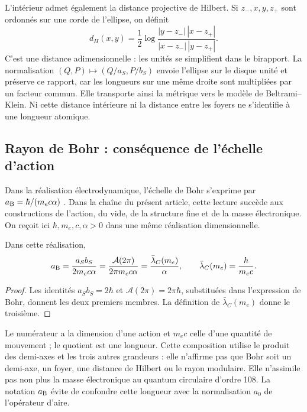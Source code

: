 L'intérieur admet également la distance projective de Hilbert. Si
\(z_-,x,y,z_+\) sont ordonnés sur une corde de l'ellipse, on définit
\[
 d_H(x,y)=\frac12\log
 \frac{|y-z_-|\,|x-z_+|}{|x-z_-|\,|y-z_+|}.
\]
C'est une distance adimensionnelle : les unités se simplifient dans le birapport.
La normalisation \((Q,P)\mapsto(Q/a_S,P/b_S)\) envoie l'ellipse
sur le disque unité et préserve ce rapport, car les longueurs sur une
même droite sont multipliées par un facteur commun. Elle transporte ainsi la métrique
vers le modèle de Beltrami--Klein. Ni cette distance intérieure ni la distance
entre les foyers ne s'identifie à une longueur atomique.

\subsection{Rayon de Bohr : conséquence de l'échelle d'action}
\label{sec:ii-elipse-bohr}

Dans la réalisation électrodynamique, l'échelle de Bohr s'exprime par
\(a_{\rm B}=\hbar/(m_ec\alpha)\) \cite{codata2022}. Dans la chaîne
du présent article, cette lecture succède aux constructions de
l'action, du vide, de la structure fine et de la masse électronique. On reçoit ici
\(\hbar,m_e,c,\alpha>0\) dans une même réalisation dimensionnelle.
\begin{proposition}
\label{prop:ii-elipse-bohr}
Dans cette réalisation,
\begin{equation}
 a_{\rm B}=\frac{a_Sb_S}{2m_ec\alpha}
 =\frac{\mathcal A(2\pi)}{2\pi m_ec\alpha}
 =\frac{\bar\lambda_C(m_e)}{\alpha},\qquad
 \bar\lambda_C(m_e)=\frac{\hbar}{m_ec}.
 \label{eq:ii-elipse-bohr}
\end{equation}
\end{proposition}
\begin{proof}
Les identités \(a_Sb_S=2\hbar\) et
\(\mathcal A(2\pi)=2\pi\hbar\), substituées dans l'expression
de Bohr, donnent les deux premiers membres. La définition de
\(\bar\lambda_C(m_e)\) donne le troisième.
\end{proof}

Le numérateur a la dimension d'une action et \(m_ec\) celle d'une quantité de mouvement ; le
quotient est une longueur. Cette composition utilise le produit des
demi-axes et les trois autres grandeurs : elle n'affirme pas que Bohr soit un demi-axe,
un foyer, une distance de Hilbert ou le rayon modulaire. Elle n'assimile pas non plus
la masse électronique au quantum circulaire d'ordre 108. La notation
\(a_{\rm B}\) évite de confondre cette longueur avec la normalisation
\(a_0\) de l'opérateur d'aire.

